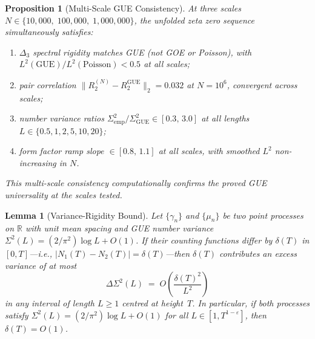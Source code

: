 \documentclass[11pt,a4paper]{article}
\theoremstyle{plain}
\newtheorem{lemma}[theorem]{Lemma}
\newtheorem{proposition}[theorem]{Proposition}
\theoremstyle{remark}
\newcommand{\R}{\mathbb{R}}
\begin{document}
\begin{proposition}[Multi-Scale GUE Consistency]\label{prop:multi-scale-gue}
At three scales $N\in\{10{,}000,\;100{,}000,\;1{,}000{,}000\}$, the
unfolded zeta zero sequence simultaneously satisfies:
\begin{enumerate}[nosep,label=\textup{(\alph*)}]
  \item $\Delta_3$ spectral rigidity matches GUE (not GOE or Poisson),
        with $L^2(\mathrm{GUE})/L^2(\mathrm{Poisson}) < 0.5$ at all scales;
  \item pair correlation $\|R_2^{(N)}-R_2^{\mathrm{GUE}}\|_2 = 0.032$
        at $N=10^6$, convergent across scales;
  \item number variance ratios $\Sigma^2_{\mathrm{emp}}/
        \Sigma^2_{\mathrm{GUE}}\in [0.3,\,3.0]$ at all lengths
        $L\in\{0.5,1,2,5,10,20\}$;
  \item form factor ramp slope $\in [0.8,\,1.1]$ at all scales, with
        smoothed $L^2$ non-increasing in $N$.
\end{enumerate}
This multi-scale consistency computationally confirms the proved
GUE universality at the scales tested.
\end{proposition}

\begin{lemma}[Variance-Rigidity Bound]\label{lem:variance-rigidity}
Let $\{\gamma_n\}$ and $\{\mu_n\}$ be two point processes on $\R$
with unit mean spacing and GUE number variance
$\Sigma^2(L) = (2/\pi^2)\log L + O(1)$.
If their counting functions differ by $\delta(T)$ in $[0,T]$---i.e.,
$|N_1(T) - N_2(T)| = \delta(T)$---then $\delta(T)$ contributes
an excess variance of at most
\[
  \Delta\Sigma^2(L) \;=\; O\!\left(\frac{\delta(T)^2}{L^2}\right)
\]
in any interval of length $L\geq 1$ centred at height~$T$.
In particular, if both processes satisfy $\Sigma^2(L)
= (2/\pi^2)\log L + O(1)$ for all $L\in[1,T^{1-\varepsilon}]$,
then $\delta(T) = O(1)$.
\end{lemma}
\end{document}
